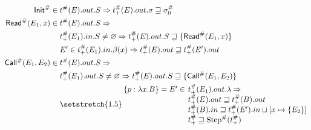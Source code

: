 \begin{align*}
  \Abs\InitE\in{}          & \Abs\ptree(E).\abbrtext{out}.\event\Rightarrow\Abs\ptree_+(E).\abbrtext{out}.\ctx\sqsupseteq\Abs\ctx_0                                   \\
  \Abs\ReadE(E_1,x)\in{}   & \Abs\ptree(E).\abbrtext{out}.\event\Rightarrow                                                                                           \\
                           & \Abs\ptree_+(E_1).\abbrtext{in}.\event\neq\varnothing\Rightarrow\Abs\ptree_+(E).\abbrtext{out}.\event\sqsupseteq\{\Abs\ReadE(E_1,x)\}    \\
                           & E'\in\Abs\ptree_+(E_1).\abbrtext{in}.\beta(x)\Rightarrow\Abs\ptree_+(E).\abbrtext{out}\sqsupseteq\Abs\ptree_+(E').\abbrtext{out}         \\
  \Abs\CallE(E_1,E_2)\in{} & \Abs\ptree(E).\abbrtext{out}.\event\Rightarrow                                                                                           \\
                           & \Abs\ptree_+(E_1).\abbrtext{out}.\event\neq\varnothing\Rightarrow\Abs\ptree_+(E).\abbrtext{out}.\event\sqsupseteq\{\Abs\CallE(E_1,E_2)\} \\
                           & {\setlength{\arraycolsep}{2pt}\setstretch{1.5}
      \begin{array}{rl}
        \{p:\lambda x.B\}=E'\in & \Abs\ptree_+(E_1).\abbrtext{out}.\lambda\Rightarrow                                           \\
                                & \Abs\ptree_+(E).\abbrtext{out}\sqsupseteq\Abs\ptree_+(B).\abbrtext{out}                       \\
                                & \Abs\ptree_+(B).\abbrtext{in}\sqsupseteq\Abs\ptree_+(E').\abbrtext{in}\sqcup[x\mapsto\{E_2\}] \\
                                & \Abs\ptree_+\sqsupseteq\Abs\Step(\Abs\ptree_+)
      \end{array}}
  \\
\end{align*}

